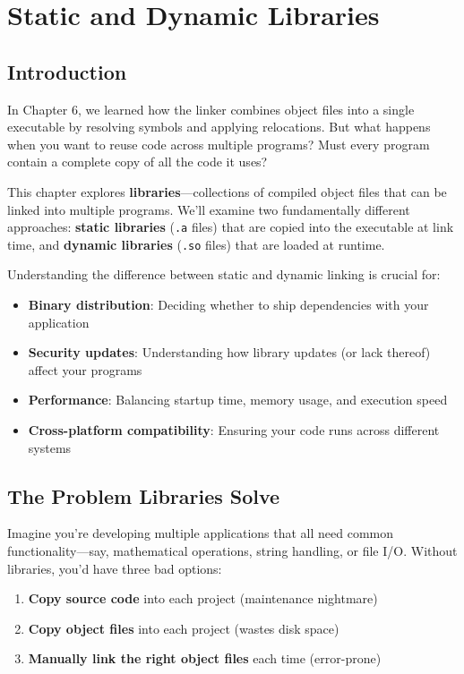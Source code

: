 \chapter{Static and Dynamic Libraries}

\section{Introduction}

In Chapter 6, we learned how the linker combines object files into a single executable by resolving symbols and applying relocations. But what happens when you want to reuse code across multiple programs? Must every program contain a complete copy of all the code it uses?

This chapter explores \textbf{libraries}—collections of compiled object files that can be linked into multiple programs. We'll examine two fundamentally different approaches: \textbf{static libraries} (\texttt{.a} files) that are copied into the executable at link time, and \textbf{dynamic libraries} (\texttt{.so} files) that are loaded at runtime.

Understanding the difference between static and dynamic linking is crucial for:
\begin{itemize}
    \item \textbf{Binary distribution}: Deciding whether to ship dependencies with your application
    \item \textbf{Security updates}: Understanding how library updates (or lack thereof) affect your programs
    \item \textbf{Performance}: Balancing startup time, memory usage, and execution speed
    \item \textbf{Cross-platform compatibility}: Ensuring your code runs across different systems
\end{itemize}

\section{The Problem Libraries Solve}

Imagine you're developing multiple applications that all need common functionality—say, mathematical operations, string handling, or file I/O. Without libraries, you'd have three bad options:

\begin{enumerate}
    \item \textbf{Copy source code} into each project (maintenance nightmare)
    \item \textbf{Copy object files} into each project (wastes disk space)
    \item \textbf{Manually link the right object files} each time (error-prone)
\end{enumerate}


